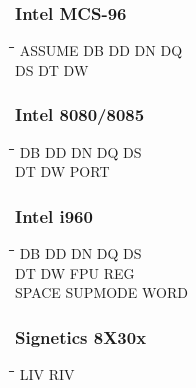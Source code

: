 \subsubsection{Intel MCS-96}
{\tt\begin{tabbing}
\hspace{3cm}\=\hspace{3cm}\=\hspace{3cm}\=\hspace{3cm}\=\kill
ASSUME     \> DB          \> DD          \> DN          \> DQ \\
DS         \> DT          \> DW \\
\end{tabbing}}
 
\subsubsection{Intel 8080/8085}
{\tt\begin{tabbing}
\hspace{3cm}\=\hspace{3cm}\=\hspace{3cm}\=\hspace{3cm}\=\kill
DB         \> DD          \> DN          \> DQ          \> DS \\
DT         \> DW          \> PORT \\
\end{tabbing}}

\subsubsection{Intel i960}
{\tt\begin{tabbing}
\hspace{3cm}\=\hspace{3cm}\=\hspace{3cm}\=\hspace{3cm}\=\kill    
DB         \> DD          \> DN          \> DQ          \> DS \\
DT         \> DW          \>             \> FPU         \> REG \\
SPACE      \> SUPMODE     \> WORD \\
\end{tabbing}}

\subsubsection{Signetics 8X30x}
{\tt\begin{tabbing}
\hspace{3cm}\=\hspace{3cm}\=\hspace{3cm}\=\hspace{3cm}\=\kill
LIV        \> RIV         \\   
\end{tabbing}}

